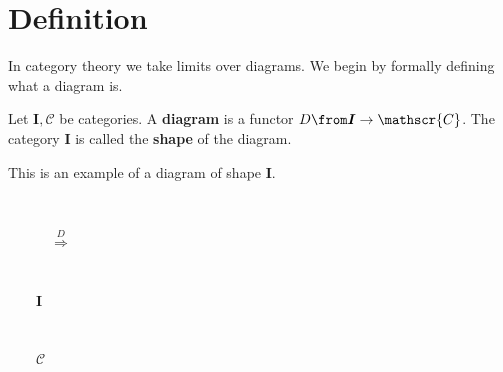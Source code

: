 \chapter{Definition}
In category theory we take limits over diagrams.
We begin by formally defining what a diagram is.

\begin{definition}
  Let $\bm{I}, \mathscr{C}$ be categories.
  A \textbf{diagram} is a functor $D \from \bm{I} \to \mathscr{C}$.
  The category $\bm{I}$ is called the \textbf{shape} of the diagram.
\end{definition}
\begin{example}
  \label{diagramexample}
  This is an example of a diagram of shape $\bm I$. \\[1cm]
  \begin{minipage}{0.3\linewidth}
    \hspace{2cm}
    \\
  \end{minipage}%
  \begin{minipage}{0.2\linewidth}
    $\qquad\quad\overset{D}{\Longrightarrow}$
  \end{minipage}%
  \begin{minipage}{0.1\linewidth}
  \end{minipage}\\[2em]
  \begin{minipage}{0.3\linewidth}
    \hspace{2cm}
    $\qquad \bm I$
  \end{minipage}%
  \begin{minipage}{0.2\linewidth}
    \
  \end{minipage}%
  \begin{minipage}{0.3\linewidth}
    \hspace{2cm}
    $\qquad \mathscr C$
  \end{minipage}\\[1em]
\end{example}

